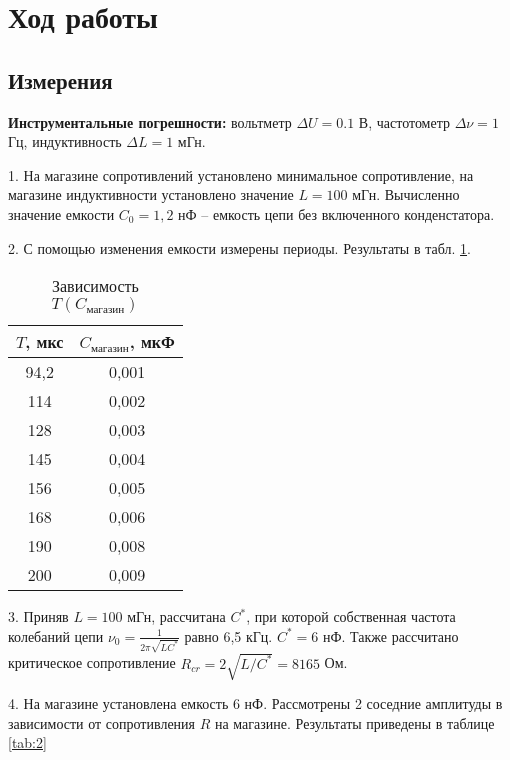\section{Ход работы}
\subsection{Измерения}

\textbf{Инструментальные погрешности:}
вольтметр $\Delta U = 0.1$ В, частотометр $\Delta \nu = 1$ Гц, индуктивность $\Delta L = 1$ мГн.

1. На магазине сопротивлений установлено минимальное сопротивление, на магазине индуктивности установлено значение $L = 100$ мГн. Вычисленно значение емкости $C_0 = 1,2$ нФ -- емкость цепи без включенного конденстатора.

2. С помощью изменения емкости измерены периоды. Результаты в табл. \ref{tab:1}.

\begin{table}[h]
    \centering
    \begin{tabular}{|c|c|}
        \hline
        $T$, мкс & $C_\text{магазин}$, мкФ \\
        \hline
        94,2 & 0,001 \\
        \hline
        114	& 0,002 \\
        \hline
        128	& 0,003 \\
        \hline
        145	& 0,004 \\
        \hline
        156	& 0,005 \\
        \hline
        168	& 0,006 \\
        \hline
        190	& 0,008 \\
        \hline
        200	& 0,009 \\
        \hline
    \end{tabular}
    \caption{Зависимость $T(C_\text{магазин})$}
    \label{tab:1}
\end{table}

3. Приняв $L = 100$ мГн, рассчитана $C^*$, при которой собственная частота колебаний цепи $\nu_0 = \frac{1}{2\pi\sqrt{LC^*}}$ равно 6,5 кГц. $C^* = 6$ нФ. Также рассчитано критическое сопротивление $R_{cr} = 2\sqrt{L/C^*} = 8165$ Ом.

4. На магазине установлена емкость 6 нФ. Рассмотрены 2 соседние амплитуды в зависимости от сопротивления $R$ на магазине. Результаты приведены в таблице \ref{tab:2}


